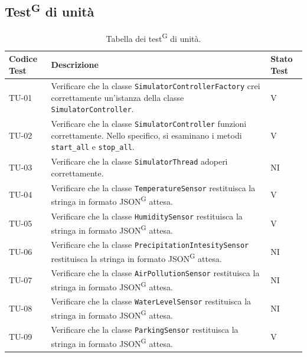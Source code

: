 \documentclass[8pt]{article}
\newcommand{\glossterm}[1]{#1\textsuperscript{G}} %
\begin{document}
\subsection{\glossterm{Test} di unità}\label{sec:test unita}
\renewcommand{\arraystretch}{2.5}
\begin{longtable}{|>{\centering}p{2cm}|>{\RaggedRight}m{12cm}|>{\centering\arraybackslash}p{2cm}|}
    \hline
    \rowcolor{white}
    \textbf{Codice Test} & \textbf{Descrizione} & \textbf{Stato Test} \\
    \hline
    \endfirsthead 
    \rowcolor{white}
    \caption{Tabella dei \glossterm{test} di unità.} 
    \label{table:Tabella dei test di unità}
    \endlastfoot 
    
    TU-01 & Verificare che la classe \verb|SimulatorControllerFactory| crei correttamente un'istanza
    della classe \verb|SimulatorController|.  & V \\
    \hline

    TU-02 & Verificare che la classe \verb|SimulatorController| funzioni correttamente. Nello
    specifico, si esaminano i metodi \verb|start_all| e \verb|stop_all|.  & V \\
    \hline

    TU-03 & Verificare che la classe \verb|SimulatorThread| adoperi correttamente. & NI \\
    \hline

    TU-04 & Verificare che la classe \verb|TemperatureSensor| restituisca la stringa in formato \glossterm{JSON} attesa. & V \\
    \hline

    TU-05 & Verificare che la classe \verb|HumiditySensor| restituisca la stringa in formato \glossterm{JSON} attesa. & V \\
    \hline

    TU-06 & Verificare che la classe \verb|PrecipitationIntesitySensor| restituisca la stringa in formato \glossterm{JSON} attesa. & NI \\
    \hline

    TU-07 & Verificare che la classe \verb|AirPollutionSensor| restituisca la stringa in formato \glossterm{JSON} attesa. & NI \\
    \hline

    TU-08 & Verificare che la classe \verb|WaterLevelSensor| restituisca la stringa in formato \glossterm{JSON} attesa. & NI \\
    \hline

    TU-09 & Verificare che la classe \verb|ParkingSensor| restituisca la stringa in formato \glossterm{JSON} attesa. & V \\
    \hline


\end{longtable}
\end{document}
